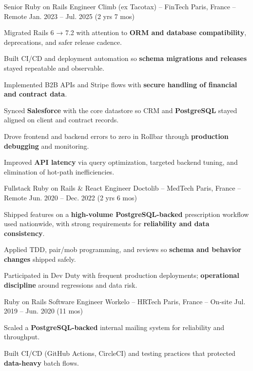 \begin{cventries}
\cventry
  {Senior Ruby on Rails Engineer}
  {Climb (ex Tacotax) – FinTech}
  {Paris, France – Remote}
  {Jan. 2023 – Jul. 2025 (2 yrs 7 mos)}
  {
    \begin{cvitems}
      \item {Migrated Rails 6 → 7.2 with attention to \textbf{ORM and database compatibility}, deprecations, and safer release cadence.}
      \item {Built CI/CD and deployment automation so \textbf{schema migrations and releases} stayed repeatable and observable.}
      \item {Implemented B2B APIs and Stripe flows with \textbf{secure handling of financial and contract data}.}
      \item {Synced \textbf{Salesforce} with the core datastore so CRM and \textbf{PostgreSQL} stayed aligned on client and contract records.}
      \item {Drove frontend and backend errors to zero in Rollbar through \textbf{production debugging} and monitoring.}
      \item {Improved \textbf{API latency} via query optimization, targeted backend tuning, and elimination of hot-path inefficiencies.}
    \end{cvitems}
  }

\cventry
  {Fullstack Ruby on Rails \& React Engineer}
  {Doctolib – MedTech}
  {Paris, France – Remote}
  {Jun. 2020 – Dec. 2022 (2 yrs 6 mos)}
  {
    \begin{cvitems}
      \item {Shipped features on a \textbf{high-volume PostgreSQL-backed} prescription workflow used nationwide, with strong requirements for \textbf{reliability and data consistency}.}
      \item {Applied TDD, pair/mob programming, and reviews so \textbf{schema and behavior changes} shipped safely.}
      \item {Participated in Dev Duty with frequent production deployments; \textbf{operational discipline} around regressions and data risk.}
    \end{cvitems}
  }

\cventry
  {Ruby on Rails Software Engineer}
  {Workelo – HRTech}
  {Paris, France – On-site}
  {Jul. 2019 – Jun. 2020 (11 mos)}
  {
    \begin{cvitems}
      \item {Scaled a \textbf{PostgreSQL-backed} internal mailing system for reliability and throughput.}
      \item {Built CI/CD (GitHub Actions, CircleCI) and testing practices that protected \textbf{data-heavy} batch flows.}
    \end{cvitems}
  }


\end{cventries}
